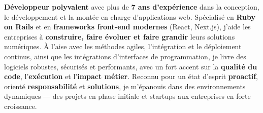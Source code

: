 
\begin{cvparagraph}
\textbf{Développeur polyvalent} avec plus de \textbf{7 ans d'expérience} dans la conception, le développement et la montée en charge d'applications web. Spécialisé en \textbf{Ruby on Rails} et en \textbf{frameworks front-end modernes} (React, Next.js), j'aide les entreprises à \textbf{construire, faire évoluer et faire grandir} leurs solutions numériques. À l'aise avec les méthodes agiles, l'intégration et le déploiement continus, ainsi que les intégrations d'interfaces de programmation, je livre des logiciels robustes, sécurisés et performants, avec un fort accent sur la \textbf{qualité du code}, l'\textbf{exécution} et l'\textbf{impact métier}. Reconnu pour un état d'esprit \textbf{proactif}, orienté \textbf{responsabilité} et \textbf{solutions}, je m'épanouis dans des environnements dynamiques — des projets en phase initiale et startups aux entreprises en forte croissance.
\end{cvparagraph}
